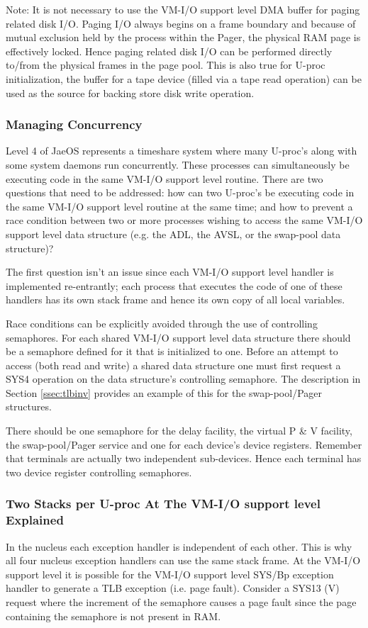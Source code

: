 Note: It is not necessary to use the VM-I/O support level DMA buffer for paging related disk I/O. 
Paging I/O always begins on a frame boundary and because of mutual exclusion held by the process within the Pager, the physical RAM page is effectively locked. 
Hence paging related disk I/O can be performed directly to/from the physical frames in the page pool. 
This is also true for U-proc initialization, the buffer for a tape device (filled via a tape read operation) can be used as the source for backing store disk write operation.


\subsubsection{Managing Concurrency}\label{ssec:concurr}
Level 4 of JaeOS represents a timeshare system where many U-proc's along with some system daemons run concurrently. 
These processes can simultaneously be executing code in the same VM-I/O support level routine. 
There are two questions that need to be addressed: how can two U-proc's be executing code in the same VM-I/O support level routine at the same time; and how to prevent a race condition between two or more processes wishing to access the same VM-I/O support level data structure (e.g. the ADL, the AVSL, or the swap-pool data structure)?

The first question isn't an issue since each VM-I/O support level handler is implemented re-entrantly; each process that executes the code of one of these handlers has its own stack frame and hence its own copy of all local variables.

Race conditions can be explicitly avoided through the use of controlling semaphores.
For each shared VM-I/O support level data structure there should be a semaphore defined for it that is initialized to one. 
Before an attempt to access (both read and write) a shared data structure one must first request a SYS4 operation on the data structure's controlling semaphore. 
The description in Section \ref{ssec:tlbinv} provides an example of this for the swap-pool/Pager structures.

There should be one semaphore for the delay facility, the virtual P \& V facility, the swap-pool/Pager service and one for each device's device registers. 
Remember that terminals are actually two independent sub-devices. 
Hence each terminal has two device register controlling semaphores.


\subsubsection{Two Stacks per U-proc At The VM-I/O support level Explained}
In the nucleus each exception handler is independent of each other. 
This is why all four nucleus exception handlers can use the same stack frame. 
At the VM-I/O support level it is possible for the VM-I/O support level SYS/Bp exception handler to generate a TLB exception (i.e. page fault). 
Consider a SYS13 (V) request where the increment of the semaphore causes a page fault since the page containing the semaphore is not present in RAM.

